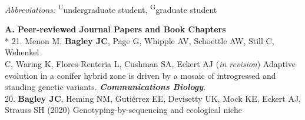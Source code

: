 \documentclass[margin,line]{res}
\begin{document}
\begin{resume}

\emph{Abbreviations:} \textsuperscript{U}undergraduate student, \textsuperscript{G}graduate student

\textbf{A. Peer-reviewed Journal Papers and Book Chapters}\vspace{2mm}\\*
21. Menon M, \textbf{Bagley JC}, Page G, Whipple AV, Schoettle AW, Still C, Wehenkel\\
\hspace*{8mm} C, Waring K, Flores-Renteria L, Cushman SA, Eckert AJ (\emph{in revision}) Adaptive\\
\hspace*{8mm} evolution in a conifer hybrid zone is driven by a mosaic of introgressed and\\ \vspace{2mm}
\hspace*{8mm}standing genetic variants. {\it \textbf{Communications Biology}}. \\
20. \textbf{Bagley JC}, Heming NM, Guti\'{e}rrez EE, Devisetty UK, Mock KE, Eckert AJ,\\
\hspace*{8mm} Strauss SH (2020) Genotyping-by-sequencing and ecological niche \\

\end{resume}
\end{document}
